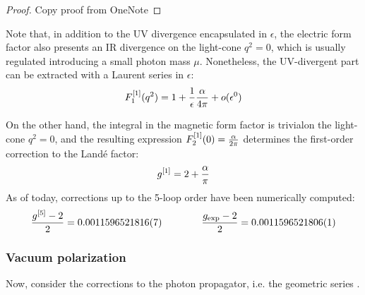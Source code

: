 \begin{proofbox}
  \begin{proof}
    Copy proof from OneNote
  \end{proof}
\end{proofbox}

Note that, in addition to the UV divergence encapsulated in $ \epsilon $, the electric form factor also presents an IR divergence on the light-cone $ q^2 = 0 $, which is usually regulated introducing a small photon mass $ \mu $. Nonetheless, the UV-divergent part can be extracted with a Laurent series in $ \epsilon $:
\begin{equation}
  F_1^{[1]}(q^2) = 1 + \frac{1}{\epsilon} \frac{\alpha}{4\pi} + o(\epsilon^0)
  \label{eq:electric-form-factor-div}
\end{equation}

On the other hand, the integral in the magnetic form factor is trivial\footnotemark on the light-cone $ q^2 = 0 $, and the resulting expression $ F_2^{[1]}(0) = \frac{\alpha}{2\pi} $ determines the first-order correction to the Landé factor:
\begin{equation*}
  g^{[1]} = 2 + \frac{\alpha}{\pi}
\end{equation*}
As of today, corrections up to the 5-loop order have been numerically computed:
\begin{equation*}
  \frac{g^{[5]} - 2}{2} = 0.0011596521816(7)
  \qquad \qquad
  \frac{g_\text{exp} - 2}{2} = 0.0011596521806(1)
\end{equation*}


\subsubsection{Vacuum polarization}

Now, consider the corrections to the photon propagator, i.e. the geometric series .


